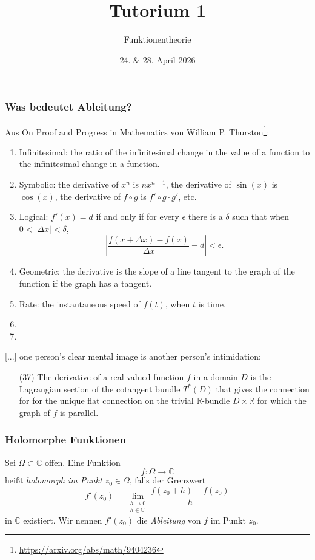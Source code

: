 \documentclass[10pt]{beamer}
\author[\url{https://fdf-uni.github.io/ft}]{}
\title{Tutorium 1}
\subtitle{\texorpdfstring{Funktionentheorie\vspace*{-1.5cm}}{Funktionentheorie}}
\date{24. \& 28. April 2026}
\begin{document}
\begin{frame}
	\titlepage
\end{frame}
\begin{frame}
	\frametitle{Was bedeutet \glqq Ableitung\grqq{}?}
	\pause
	Aus \glqq{}On Proof and Progress in Mathematics\grqq{} von William P. Thurston\footnote{\url{https://arxiv.org/abs/math/9404236}}:
	\pause
	\begin{enumerate}[label=(\arabic*)]
		\item Infinitesimal: the ratio of the infinitesimal change in the value of a function to the infinitesimal change in a function.
		      \pause
		\item Symbolic: the derivative of $x^n$ is $n x^{n - 1}$, the derivative of $\sin(x)$ is $\cos(x)$, the derivative of $f \circ g$ is $f' \circ g \cdot g'$, etc.
		      \pause
		\item Logical: $f'(x) = d$ if and only if for every $\epsilon$ there is a $\delta$ such that when $0 < \lvert \Delta x \rvert < \delta$,
		      \[ \left\lvert \frac{f(x + \Delta x) - f(x)}{\Delta x} - d \right\rvert < \epsilon. \]
		      \pause
		\item Geometric: the derivative is the slope of a line tangent to the graph of the function if the graph has a tangent.
		      \pause
		\item Rate: the instantaneous speed of $f(t)$, when $t$ is time.
		      \pause
		\item {\color<10->{blue}{Approximation: The derivative of a function is the best linear approximation to the function near a point.}}
		      \pause
		\item {\color<11->{blue}{Microscopic: The derivative of a function is the limit of what you get by looking at it under a microscope of higher and higher power.}}
	\end{enumerate}
\end{frame}
\begin{frame}
	\glqq{}[...] one person's clear mental image is another person's intimidation:
	\begin{enumerate}
		\item[(37)] The derivative of a real-valued function $f$ in a domain $D$ is the Lagrangian section of the cotangent bundle $T^{\ast}(D)$ that gives the connection for for the unique flat connection on the trivial $\mathbb{R}$-bundle $D \times \mathbb{R}$ for which the graph of $f$ is parallel.\grqq{}
	\end{enumerate}
\end{frame}
\begin{frame}
	\frametitle{Holomorphe Funktionen}
	\begin{definition}
		Sei $\Omega \subset \mathbb{C}$ offen.
		Eine Funktion
		$$
			f \colon \Omega \to \mathbb{C}
		$$
		heißt \emph{holomorph im Punkt $z_0 \in \Omega$}, falls der Grenzwert
		$$
			f'(z_0) = \lim_{\substack{h \to 0 \\ h \in \mathbb{C}}} \frac{f(z_0 + h) - f(z_0)}{h}
		$$
		in $\mathbb{C}$ existiert.
		Wir nennen $f'(z_0)$ die \emph{Ableitung} von $f$ im Punkt $z_0$.
	\end{definition}
\end{frame}
\end{document}
